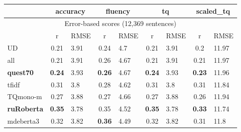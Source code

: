 \begin{table}[H]
	\centering
	\begin{tabular}{l|cl|cl|cl|cl}
		\toprule
		& \multicolumn{2}{c}{accuracy} & \multicolumn{2}{c}{fluency}  & \multicolumn{2}{c}{tq} & \multicolumn{2}{c}{scaled\_tq}    \\
		\midrule
		\multicolumn{9}{c}{Error-based scores (12,369 sentences)} \\
		\midrule
		& r        & RMSE & r       & RMSE & r    & RMSE & r    & RMSE  \\
		\midrule
		UD                & 0.21 & 3.91  & 0.24 & 4.7   & 0.21 & 3.91  & 0.2  & 11.97 \\
		all               & 0.21 & 3.91  & 0.26 & 4.67  & 0.21 & 3.91  & 0.21 & 11.97 \\
		\textbf{quest70}  & \textbf{0.24} & 3.93  & \textbf{0.26} & 4.67  & \textbf{0.24} & 3.93  & \textbf{0.23} & 11.96 \\
		\midrule
		tfidf             & 0.31 & 3.8   & 0.28 & 4.62  & 0.31 & 3.8   & 0.31 & 11.84 \\
		\midrule
		TQmono-m          & 0.27 & 3.88  & 0.27 & 4.66  & 0.27 & 3.88  & 0.26 & 11.94 \\
		\textbf{ruRoberta}   & \textbf{0.35} & 3.78  & 0.35 & 4.52  & \textbf{0.35} & 3.78  & \textbf{0.33} & 11.74 \\
		mdeberta3    & 0.32 & 3.82  & \textbf{0.36} & 4.49  & 0.32 & 3.82  & 0.31 & 11.8  \\
		\midrule

\end{tabular}
\end{table}
